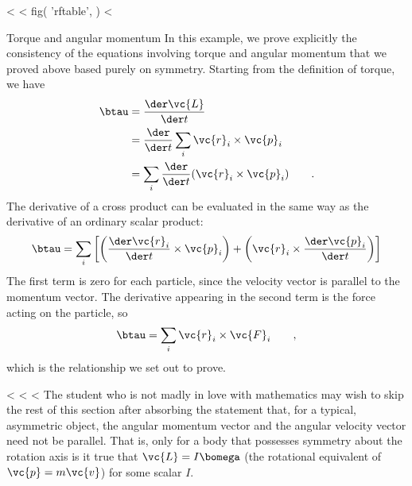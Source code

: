 <%
<%
  fig(
    'rftable',
  )
<%

\begin{eg}{Torque and angular momentum}\label{eg:torqueproof}
In this example, we prove explicitly the consistency of the
equations involving torque and angular momentum that we
proved above based purely on symmetry.
Starting from the definition of torque, we
have
\begin{align*}
        \btau                &= \frac{\der\vc{L}}{\der t} \\
                        &= \frac{\der}{\der t}\sum_{i} \vc{r}_i\times\vc{p}_i \\
                        &= \sum_{i} \frac{\der}{\der t}(\vc{r}_i\times\vc{p}_{i}) \qquad .
\end{align*}
The derivative of a cross product can be evaluated in the same way
as the derivative of an ordinary scalar product:
\begin{equation*}
                \btau = \sum_i\left[
                                \left(\frac{\der\vc{r}_{i}}{\der t}\times\vc{p}_i\right)
                                +\left(\vc{r}_i\times\frac{\der\vc{p}_{i}}{\der t}\right)
                        \right]
\end{equation*}
The first term is zero for each particle, since the velocity
vector is parallel to the momentum vector. The derivative
appearing in the second term is the force acting on
the particle, so
\begin{equation*}
        \btau                =    \sum_i \vc{r}_{i}\times\vc{F}_i \qquad  ,
\end{equation*}
which is the relationship we set out to prove.
\end{eg}

<%
<%
<%
The student who is not madly in love with mathematics may
wish to skip the rest of this section after absorbing the
statement that, for a typical, asymmetric object, the angular
momentum vector and the angular velocity vector need not be
parallel. That is, only for a body that possesses 
symmetry about the rotation axis is it true that $\vc{L}=I\bomega$ (the
rotational equivalent of $\vc{p}=m\vc{v}$) for some scalar $I$.

